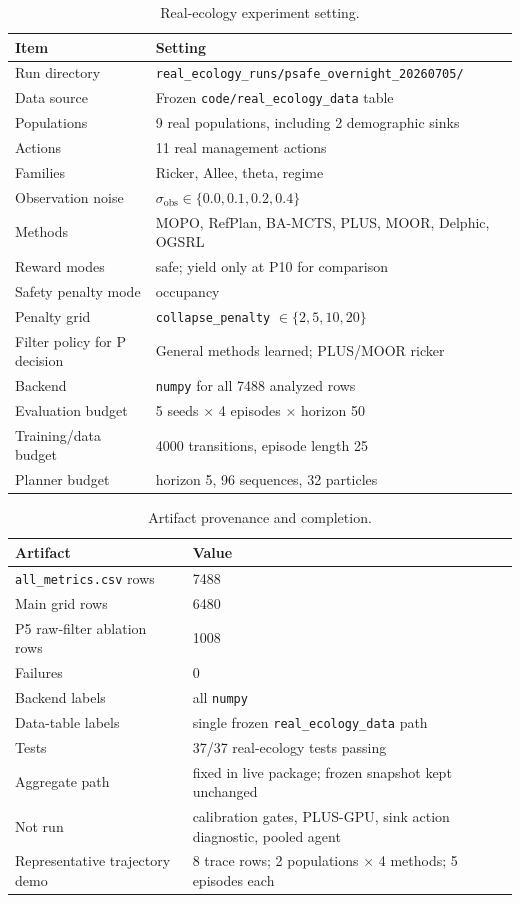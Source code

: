 \documentclass[11pt]{article}
\begin{document}
\begin{table}[htbp]
\centering
\caption{Real-ecology experiment setting.}
\begin{tabular}{ll}
\toprule
Item & Setting \\
\midrule
Run directory & \texttt{real\_ecology\_runs/psafe\_overnight\_20260705/} \\
Data source & Frozen \texttt{code/real\_ecology\_data} table \\
Populations & 9 real populations, including 2 demographic sinks \\
Actions & 11 real management actions \\
Families & Ricker, Allee, theta, regime \\
Observation noise & $\sigma_{\mathrm{obs}}\in\{0.0,0.1,0.2,0.4\}$ \\
Methods & MOPO, RefPlan, BA-MCTS, PLUS, MOOR, Delphic, OGSRL \\
Reward modes & safe; yield only at P10 for comparison \\
Safety penalty mode & occupancy \\
Penalty grid & \texttt{collapse\_penalty} $\in\{2,5,10,20\}$ \\
Filter policy for P decision & General methods learned; PLUS/MOOR ricker \\
Backend & \texttt{numpy} for all 7488 analyzed rows \\
Evaluation budget & 5 seeds $\times$ 4 episodes $\times$ horizon 50 \\
Training/data budget & 4000 transitions, episode length 25 \\
Planner budget & horizon 5, 96 sequences, 32 particles \\
\bottomrule
\end{tabular}
\end{table}

\begin{table}[htbp]
\centering
\caption{Artifact provenance and completion.}
\begin{tabular}{ll}
\toprule
Artifact & Value \\
\midrule
\texttt{all\_metrics.csv} rows & 7488 \\
Main grid rows & 6480 \\
P5 raw-filter ablation rows & 1008 \\
Failures & 0 \\
Backend labels & all \texttt{numpy} \\
Data-table labels & single frozen \texttt{real\_ecology\_data} path \\
Tests & 37/37 real-ecology tests passing \\
Aggregate path & fixed in live package; frozen snapshot kept unchanged \\
Not run & calibration gates, PLUS-GPU, sink action diagnostic, pooled agent \\
Representative trajectory demo & 8 trace rows; 2 populations $\times$ 4 methods; 5 episodes each \\
\bottomrule
\end{tabular}
\end{table}
\end{document}
